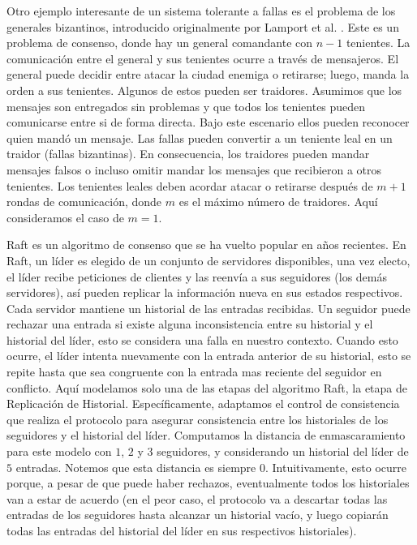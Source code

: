 Otro ejemplo interesante de un sistema tolerante a fallas es el problema de los generales bizantinos, introducido originalmente por Lamport et al. \cite{LamportSP82}. Este es un problema de consenso, donde hay un general comandante con $n-1$ tenientes. La comunicación entre el general y sus tenientes ocurre a través de mensajeros. El general puede decidir entre atacar la ciudad enemiga o retirarse; luego, manda la orden a sus tenientes. Algunos de estos pueden ser traidores. 
Asumimos que los mensajes son entregados sin problemas y que todos los tenientes pueden comunicarse entre si de forma directa. Bajo este escenario ellos pueden reconocer quien mandó un mensaje. Las fallas pueden convertir a un teniente leal en un traidor (fallas bizantinas). En consecuencia, los traidores pueden mandar mensajes falsos o incluso omitir mandar los mensajes que recibieron a otros tenientes. Los tenientes leales deben acordar atacar o retirarse después de $m + 1$ rondas de comunicación, donde $m$ es el máximo número de traidores. Aquí consideramos el caso de $m=1$.  


Raft \cite{OngaroO14} es un algoritmo de consenso que se ha vuelto popular en años recientes. En Raft, un líder es elegido de un conjunto de servidores disponibles, una vez electo, el líder recibe peticiones de clientes y las reenvía a sus seguidores (los demás servidores), así pueden replicar la información nueva en sus estados respectivos. Cada servidor mantiene un historial de las entradas recibidas. Un seguidor puede rechazar una entrada si existe alguna inconsistencia entre su historial y el historial del líder, esto se considera una falla en nuestro contexto. Cuando esto ocurre, el líder intenta nuevamente con la entrada anterior de su historial, esto se repite hasta que sea congruente con la entrada mas reciente del seguidor en conflicto. Aquí modelamos solo una de las etapas del algoritmo Raft, la etapa de Replicación de Historial. Específicamente, adaptamos el control de consistencia que realiza el protocolo para asegurar consistencia entre los historiales de los seguidores y el historial del líder. Computamos la distancia de enmascaramiento para este modelo con $1$, $2$ y $3$ seguidores, y considerando un historial del líder de $5$ entradas. Notemos que esta distancia es siempre $0$. Intuitivamente, esto ocurre porque, a pesar de que puede haber rechazos, eventualmente todos los historiales van a estar de acuerdo (en el peor caso, el protocolo va a descartar todas las entradas de los seguidores hasta alcanzar un historial vacío, y luego copiarán todas las entradas del historial del líder en sus respectivos historiales). 

